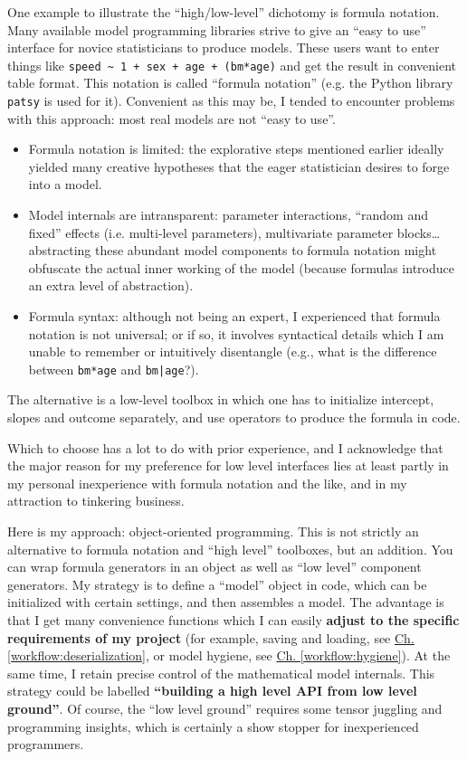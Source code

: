 One example to illustrate the ``high/low-level'' dichotomy is formula notation.
Many available model programming libraries strive to give an ``easy to use'' interface for novice statisticians to produce models.
These users want to enter things like \texttt{speed \textasciitilde{} 1 + sex + age + (bm*age)} and get the result in convenient table format.
This notation is called ``formula notation'' (e.g. the Python library \texttt{patsy} is used for it).
Convenient as this may be, I tended to encounter problems with this approach: most real models are not ``easy to use''.
\begin{itemize}
\item Formula notation is limited: the explorative steps mentioned earlier ideally yielded many creative hypotheses that the eager statistician desires to forge into a model.
\item Model internals are intransparent: parameter interactions, ``random and fixed'' effects (i.e. multi-level parameters), multivariate parameter blocks\ldots{} abstracting these abundant model components to formula notation might obfuscate the actual inner working of the model (because formulas introduce an extra level of abstraction).
\item Formula syntax: although not being an expert, I experienced that formula notation is not universal; or if so, it involves syntactical details which I am unable to remember or intuitively disentangle (e.g., what is the difference between \texttt{bm*age} and \texttt{bm|age}?).
\end{itemize}
The alternative is a low-level toolbox in which one has to initialize intercept, slopes and outcome separately, and use operators to produce the formula in code.

Which to choose has a lot to do with prior experience, and I acknowledge that the major reason for my preference for low level interfaces lies at least partly in my personal inexperience with formula notation and the like, and in my attraction to tinkering business.


Here is my approach: object-oriented programming.
This is not strictly an alternative to formula notation and ``high level'' toolboxes, but an addition.
You can wrap formula generators in an object as well as ``low level'' component generators.
My strategy is to define a ``model'' object in code, which can be initialized with certain settings, and then assembles a model.
The advantage is that I get many convenience functions which I can easily \textbf{adjust to the specific requirements of my project} (for example, saving and loading, see \hyperref[workflow:deserialization]{Ch. \ref{workflow:deserialization}}, or model hygiene, see \hyperref[workflow:hygiene]{Ch. \ref{workflow:hygiene}}).
At the same time, I retain precise control of the mathematical model internals.
This strategy could be labelled \textbf{``building a high level API from low level ground''}.
Of course, the ``low level ground'' requires some tensor juggling and programming insights, which is certainly a show stopper for inexperienced programmers.


